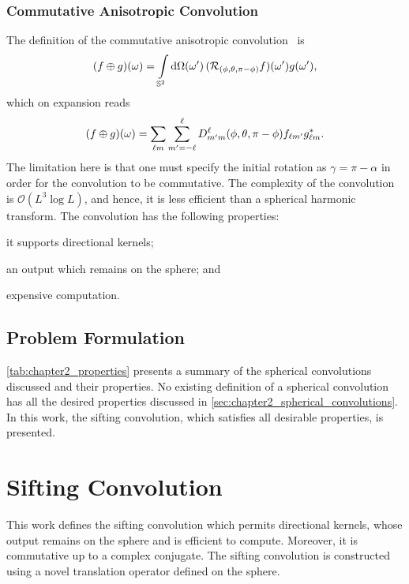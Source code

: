 \subsubsection{Commutative Anisotropic Convolution}

The definition of the commutative anisotropic convolution~\cite{Sadeghi2012,Khalid2012} is
%
\begin{equation}
	\pixel{(f \oplus g)}
	= \integrateSphere{\omega'} \pixel[']{(\rotation{(\phi,\theta,\pi-\phi)}f)} \pixel[']{g},
\end{equation}
%
which on expansion reads
%
\begin{equation}
	\pixel{(f \oplus g)}
	= \harmonicSum \sum\limits_{m'=-\ell}^{\ell} \wigner{\ell}{m'}{m}(\phi,\theta,\pi-\phi) f_{\ell m'} \conj{\harmonic{g}}.
\end{equation}
%
The limitation here is that one must specify the initial rotation as \({\gamma=\pi-\alpha}\) in order for the convolution to be commutative.
The complexity of the convolution is \(\mathcal{O}(L^{3}\log{L})\), and hence, it is less efficient than a spherical harmonic transform.
The convolution has the following properties:
%
\begin{inparaenum}[(i)]
	\item it supports directional kernels;
	\item an output which remains on the sphere; and
	\item expensive computation.
\end{inparaenum}

\subsection{Problem Formulation}

\cref{tab:chapter2_properties} presents a summary of the spherical convolutions discussed and their properties.
No existing definition of a spherical convolution has all the desired properties discussed in \cref{sec:chapter2_spherical_convolutions}.
In this work, the sifting convolution, which satisfies all desirable properties, is presented.



\section{Sifting Convolution}\label{sec:chapter2_sifting_convolution}

This work defines the sifting convolution which permits directional kernels, whose output remains on the sphere and is efficient to compute.
Moreover, it is commutative up to a complex conjugate.
The sifting convolution is constructed using a novel translation operator defined on the sphere.

